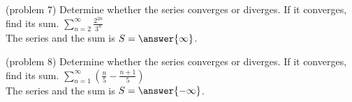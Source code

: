 \documentclass[handout]{ximera}
\begin{document}

\begin{problem}(problem 7)
Determine whether the series converges or diverges.  If it converges, find its sum. $\displaystyle \sum_{n=2}^\infty \frac{2^{2n}}{3^n}$\\
The series  and the sum is $S = \answer{\infty}$.
\end{problem}

\begin{problem}(problem 8)
Determine whether the series converges or diverges.  If it converges, find its sum. $\displaystyle \sum_{n=1}^\infty \left(\frac{n}{5} - \frac{n+1}{5}\right)$\\
The series  and the sum is $S = \answer{-\infty}$.
\end{problem}
\end{document}
